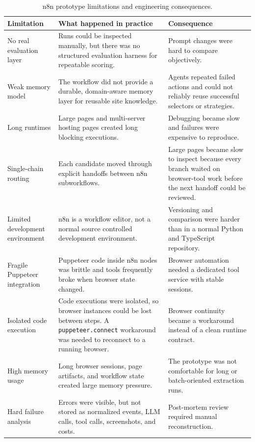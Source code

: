 \begin{table}[!htbp]
\centering
\begin{tabularx}{\textwidth}{Q{3.0cm} Y Y}
\toprule
{}
Limitation & What happened in practice & Consequence \\
\midrule
No real evaluation layer & Runs could be inspected manually, but there was no
structured evaluation harness for repeatable scoring. & Prompt changes were hard
to compare objectively. \\
Weak memory model & The workflow did not provide a durable, domain-aware memory
layer for reusable site knowledge. & Agents repeated failed actions and could
not reliably reuse successful selectors or strategies. \\
Long runtimes & Large pages and multi-server hosting pages created long blocking
executions. & Debugging became slow and failures were expensive to reproduce. \\
Single-chain routing & Each candidate moved through explicit handoffs between n8n
subworkflows. & Large pages became slow to inspect because every branch waited on
browser-tool work before the next handoff could be reviewed. \\
Limited development environment & n8n is a workflow editor, not a normal source
controlled development environment. & Versioning and comparison were harder than in a
normal Python and TypeScript repository. \\
Fragile Puppeteer integration & Puppeteer code inside n8n nodes was brittle and
tools frequently broke when browser state changed. & Browser automation needed a
dedicated tool service with stable sessions. \\
Isolated code execution & Code executions were isolated, so browser instances
could be lost between steps. A \texttt{puppeteer.connect} workaround was needed
to reconnect to a running browser. & Browser continuity became a workaround
instead of a clean runtime contract. \\
High memory usage & Long browser sessions, page artifacts, and workflow state
created large memory pressure. & The prototype was not comfortable for long or
batch-oriented extraction runs. \\
Hard failure analysis & Errors were visible, but not stored as normalized events,
LLM calls, tool calls, screenshots, and costs. & Post-mortem review required
manual reconstruction. \\
\bottomrule
\end{tabularx}
\caption{n8n prototype limitations and engineering consequences.}\label{tab:n8n-limitations}
\end{table}

